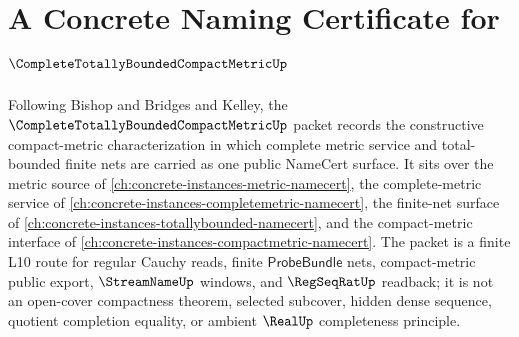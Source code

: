 \chapter{A Concrete Naming Certificate for $\CompleteTotallyBoundedCompactMetricUp$}
\label{ch:concrete-instances-complete-totally-bounded-compact-metric-namecert}

Following Bishop and Bridges and Kelley, the $\CompleteTotallyBoundedCompactMetricUp$ packet records the constructive compact-metric characterization in which complete metric service and total-bounded finite nets are carried as one public NameCert surface. It sits over the metric source of \autoref{ch:concrete-instances-metric-namecert}, the complete-metric service of \autoref{ch:concrete-instances-completemetric-namecert}, the finite-net surface of \autoref{ch:concrete-instances-totallybounded-namecert}, and the compact-metric interface of \autoref{ch:concrete-instances-compactmetric-namecert}. The packet is a finite L10 route for regular Cauchy reads, finite $\mathsf{ProbeBundle}$ nets, compact-metric public export, $\StreamNameUp$ windows, and $\RegSeqRatUp$ readback; it is not an open-cover compactness theorem, selected subcover, hidden dense sequence, quotient completion equality, or ambient $\RealUp$ completeness principle.

